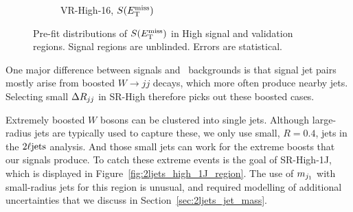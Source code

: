 \begin{figure}[tp]
\begin{subfigure}{0.48\textwidth}
\caption{VR-High-16, $\metsig$}
\end{subfigure}
\caption[
Pre-fit distributions of $\metsig$ in High signal and validation regions
]{%
Pre-fit distributions of $\metsig$ in High signal and validation regions.
Signal regions are unblinded.
Errors are statistical.
}
\label{fig:2ljets_high_region}
\end{figure}

One major difference between signals and \diboson\ backgrounds is that signal
jet pairs mostly arise from boosted $W\rightarrow jj$ decays, which more often
produce nearby jets.
Selecting small $\Delta R_{jj}$ in SR-High therefore picks out these boosted cases.

Extremely boosted $W$ bosons can be clustered into single jets.
Although large-radius jets are typically used to capture these, we only use
small, $R=0.4$, jets in the $2\ell\mathrm{jets}$ analysis.
And those small jets can work for the extreme boosts that our signals produce.
To catch these extreme events is the goal of SR-High-1J, which is displayed
in Figure~\ref{fig:2ljets_high_1J_region}.
The use of $m_{j_1}$ with small-radius jets for this region is unusual,
and required modelling of additional uncertainties that we discuss in
Section~\ref{sec:2ljets_jet_mass}.

